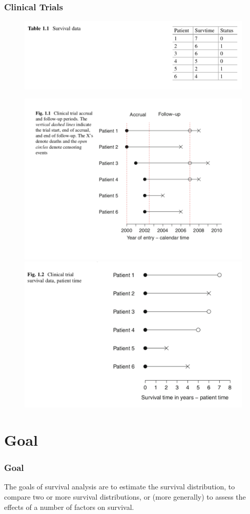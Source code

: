 \documentclass{beamer}
\begin{document}
\pagebreak
\begin{frame}
\frametitle{Clinical Trials}
\begin{figure}[h!]
 \includegraphics[scale = .35]{001.png}
\end{figure}
\begin{figure}[h!]
\includegraphics[scale = .35]{003.png}
\includegraphics[scale = .3]{002.png}
 \end{figure}
\end{frame}

\section{Goal}
\begin{frame}
\frametitle{Goal}
The goals of survival analysis are to estimate the {\color{red}survival distribution}, to {\color{red}compare} two or more survival distributions, or (more generally) to {\color{red}assess the effects of a number of factors} on survival.

\end{frame}
\end{document}

